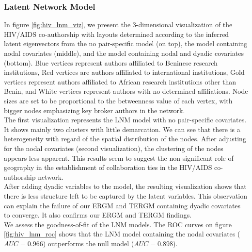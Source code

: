 \subsubsection{Latent Network Model}
\label{hiv_sec:results_lnm}
In figure \ref{fig:hiv_lnm_viz}, we present the 3-dimensional visualization of the HIV/AIDS co-authorship with layouts determined according to the inferred latent eigenvectors from the no pair-specific model (on top), the model containing nodal covariates (middle), and the model containing nodal and dyadic covariates (bottom). Blue vertices represent authors affiliated to Beninese research institutions, Red vertices are authors affiliated to international institutions, Gold vertices represent authors affiliated to African research institutions other than Benin, and White vertices represent authors with no determined affiliations. Node sizes are set to be proportional to the betweenness value of each vertex, with bigger nodes emphasizing key broker authors in the network. \\
The first visualization represents the LNM model with no pair-specific covariates. It shows mainly two clusters with little demarcation. We can see that there is a heterogeneity with regard of the spatial distribution of the nodes. After adjusting for the nodal covariates (second visualization), the clustering of the nodes appears less apparent. This results seem to suggest the non-significant role of geography in the establishment of collaboration ties in the HIV/AIDS co-authorship network. \\After adding dyadic variables to the model, the resulting visualization shows that there is less structure left to be captured by the latent variables. This observation can explain the failure of our ERGM and TERGM containing dyadic covariates to converge. It also confirms our ERGM and TERGM findings. \\
We assess the goodness-of-fit of the LNM models. The ROC curves on figure \ref{fig:hiv_lnm_roc} shows that the LNM model containing the nodal covariates ($AUC=0.966$) outperforms the null model ($AUC=0.898$).

